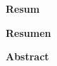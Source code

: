 \newpage 

\thispagestyle{empty}

\vfill{}
{\par\centering \textbf{\large Resum}\large \par}


\vfill{}

{\par\centering \textbf{\large Resumen}\large \par}



\vfill{}

{\par\centering \textbf{\large Abstract}\large \par}


\vfill{}